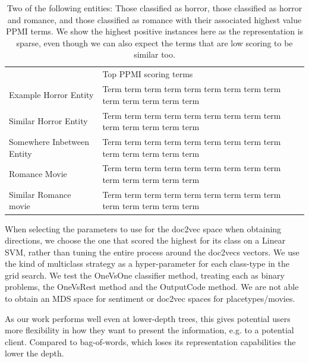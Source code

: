 \begin{table}[]
	\begin{tabular}{ll}
		& Top PPMI scoring terms                                                \\
		Example Horror Entity      & Term term term term term term term term term term term term term term \\
		Similar Horror Entity      & Term term term term term term term term term term term term term term \\
		Somewhere Inbetween Entity & Term term term term term term term term term term term term term term \\
		Romance Movie              & Term term term term term term term term term term term term term term \\
		Similar Romance movie      & Term term term term term term term term term term term term term term
	\end{tabular}
\caption{Two of the following entities: Those classified as horror, those classified as horror and romance, and those classified as romance with their associated highest value PPMI terms. We show the highest positive instances here as the representation is sparse, even though we can also expect the terms that are low scoring to be similar too.}
\label{table:PPMI_example}
\end{table}

When selecting the parameters to use for the doc2vec space when obtaining directions, we choose the one that scored the highest for its class on a Linear SVM, rather than tuning the entire process around the doc2vecs vectors.
We use the kind of multiclass strategy as a hyper-parameter for each class-type in the grid search. We test the OneVsOne classifier method, treating each as binary problems, the OneVsRest method and the OutputCode method.
We are not able to obtain an MDS space for sentiment or doc2vec spaces for placetypes/movies.

As our work performs well even at lower-depth trees, this gives potential users more flexibility in how they want to present the information, e.g. to a potential client. Compared to bag-of-words, which loses its representation capabilities the lower the depth.

